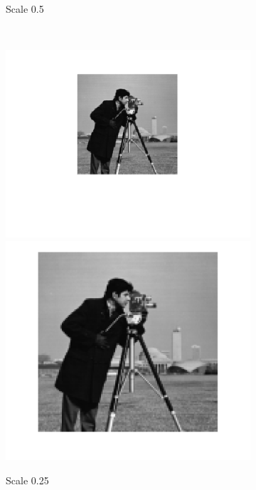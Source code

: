 \documentclass{article}
\begin{document}
\begin{figure}[h!]
\begin{subfigure}[t]{0.3\textwidth}
		\caption{Scale 0.5}
	\end{subfigure}%
	~
	\begin{subfigure}[t]{0.3\textwidth}
		\centering
		\includegraphics[width=\linewidth]{./output_images/DOWN_anti-alias_nearest_scale_0_250000.png}
		\includegraphics[width=\linewidth]{./output_images/UP_anti-alias_nearest_scale_0_250000.png}
		\caption{Scale 0.25}
	\end{subfigure}
	~
	\begin{subfigure}[t]{0.3\textwidth}
		\centering

\end{subfigure}
\end{figure}
\end{document}
